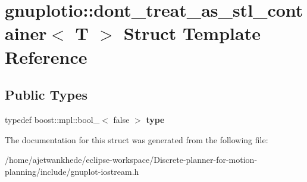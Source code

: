 \hypertarget{structgnuplotio_1_1dont__treat__as__stl__container}{}\section{gnuplotio\+:\+:dont\+\_\+treat\+\_\+as\+\_\+stl\+\_\+container$<$ T $>$ Struct Template Reference}
\label{structgnuplotio_1_1dont__treat__as__stl__container}
\subsection*{Public Types}
\begin{DoxyCompactItemize}
\item 
\mbox{\label{structgnuplotio_1_1dont__treat__as__stl__container_aa4404164a7547142376a9140ef07fd2a}} 
typedef boost\+::mpl\+::bool\+\_\+$<$ false $>$ {\bfseries type}
\end{DoxyCompactItemize}


The documentation for this struct was generated from the following file\+:\begin{DoxyCompactItemize}
\item 
/home/ajetwankhede/eclipse-\/workspace/\+Discrete-\/planner-\/for-\/motion-\/planning/include/gnuplot-\/iostream.\+h\end{DoxyCompactItemize}

